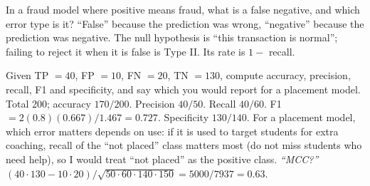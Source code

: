 \begin{qa}{ In a fraud model where positive means fraud, what is a false negative, and
which error type is it?}
\why ``False'' because the prediction was wrong, ``negative'' because the prediction was negative. The null hypothesis is ``this
transaction is normal''; failing to reject it when it is false is Type II. Its rate is $1 - $ recall.
\end{qa}

\begin{qa}{ Given TP $=40$, FP $=10$, FN $=20$, TN $=130$, compute accuracy, precision, recall, F1 and
specificity, and say which you would report for a placement model.}
\why Total 200; accuracy $170/200$. Precision $40/50$. Recall $40/60$. F1 $= 2(0.8)(0.667)/1.467 = 0.727$. Specificity $130/140$.
For a placement model, which error matters depends on use: if it is used to target students for extra coaching, recall of the
``not placed'' class matters most (do not miss students who need help), so I would treat ``not placed'' as the positive class.
\pushes \emph{``MCC?''} $(40\cdot130 - 10\cdot20)/\sqrt{50\cdot60\cdot140\cdot150} = 5000/7937 = 0.63$.
\end{qa}

